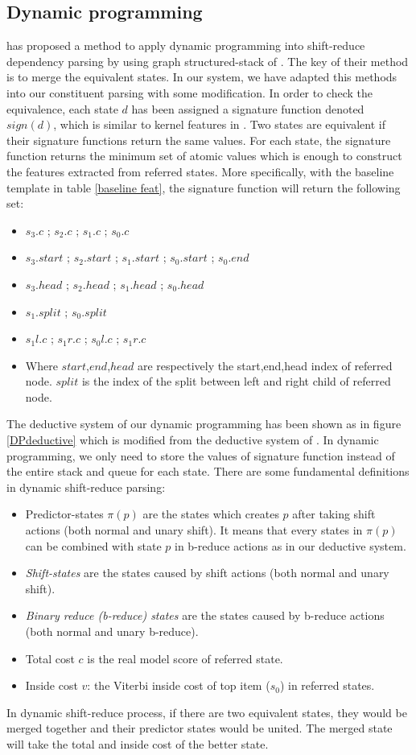 \subsection{Dynamic programming}

\cite{2010Huang} has proposed a method to apply dynamic programming into shift-reduce dependency parsing by using graph structured-stack of \cite{1991Tomita}. The key of their method is to merge the equivalent states. In our system, we have adapted this methods into our constituent parsing with some modification. In order to check the equivalence, each state $d$ has been assigned a signature function denoted $sign(d)$, which is similar to kernel features in \cite{2010Huang}. Two states are equivalent if their signature functions return the same values. For each state, the signature function returns the minimum set of atomic values which is enough to construct the features extracted from referred states. More specifically, with the baseline template in table \ref{baseline feat}, the signature function will return the following set:
\begin{itemize}
	\item $s_3.c$ ; $s_2.c$ ; $s_1.c$ ; $s_0.c$
	\item $s_3.start$ ; $s_2.start$ ; $s_1.start$ ; $s_0.start$ ; $s_0.end$
	\item $s_3.head$ ; $s_2.head$ ; $s_1.head$ ; $s_0.head$
	\item $s_1.split$ ; $s_0.split$
	\item $s_1l.c$ ; $s_1r.c$ ; $s_0l.c$ ; $s_1r.c$
	\item[]Where $start$,$end$,$head$ are respectively the start,end,head index of referred node. $split$ is the index of the split between left and right child of referred node.
\end{itemize}

The deductive system of our dynamic programming has been shown as in figure \ref{DPdeductive} which is modified from the deductive system of \cite{2010Huang}. In dynamic programming, we only need to store the values of signature function instead of the entire stack and queue for each state. There are some fundamental definitions in dynamic shift-reduce parsing:
\begin{itemize}
	\item Predictor-states $\pi(p)$ are the states which creates $p$ after taking shift actions (both normal and unary shift). It means that every states in $\pi(p)$ can be combined with state $p$ in b-reduce actions as in our deductive system. 
	\item \textit{Shift-states} are the states caused by shift actions (both normal and unary shift).
	\item \textit{Binary reduce (b-reduce) states} are the states caused by b-reduce actions (both normal and unary b-reduce).
	\item Total cost $c$ is the real model score of referred state.
	\item Inside cost $v$: the Viterbi inside cost of top item ($s_0$) in referred states.
\end{itemize}

In dynamic shift-reduce process, if there are two equivalent states, they would be merged together and their predictor states would be united. The merged state will take the total and inside cost of the better state.